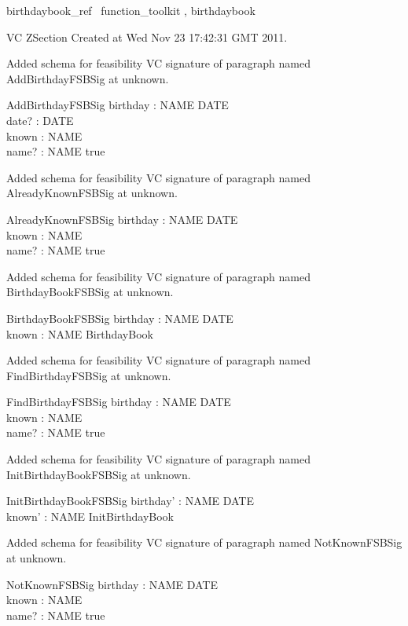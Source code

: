 \documentclass{article}
\begin{document}

\begin{zsection}	 \SECTION birthdaybook\_ref \parents~function\_toolkit , birthdaybook
\end{zsection}

VC ZSection Created at Wed Nov 23 17:42:31 GMT 2011.


Added schema for feasibility VC signature of paragraph named AddBirthdayFSBSig at unknown.
\begin{schema}{AddBirthdayFSBSig}
birthday : NAME \pfun DATE \\
 date? : DATE \\
 known : \power NAME \\
 name? : NAME 
\where
 true
\end{schema}


Added schema for feasibility VC signature of paragraph named AlreadyKnownFSBSig at unknown.
\begin{schema}{AlreadyKnownFSBSig}
birthday : NAME \pfun DATE \\
 known : \power NAME \\
 name? : NAME 
\where
 true
\end{schema}


Added schema for feasibility VC signature of paragraph named BirthdayBookFSBSig at unknown.
\begin{schema}{BirthdayBookFSBSig}
birthday : NAME \pfun DATE \\
 known : \power NAME 
\where
 BirthdayBook
\end{schema}


Added schema for feasibility VC signature of paragraph named FindBirthdayFSBSig at unknown.
\begin{schema}{FindBirthdayFSBSig}
birthday : NAME \pfun DATE \\
 known : \power NAME \\
 name? : NAME 
\where
 true
\end{schema}


Added schema for feasibility VC signature of paragraph named InitBirthdayBookFSBSig at unknown.
\begin{schema}{InitBirthdayBookFSBSig}
birthday' : NAME \pfun DATE \\
 known' : \power NAME 
\where
 InitBirthdayBook
\end{schema}


Added schema for feasibility VC signature of paragraph named NotKnownFSBSig at unknown.
\begin{schema}{NotKnownFSBSig}
birthday : NAME \pfun DATE \\
 known : \power NAME \\
 name? : NAME 
\where
 true
\end{schema}
\end{document}
